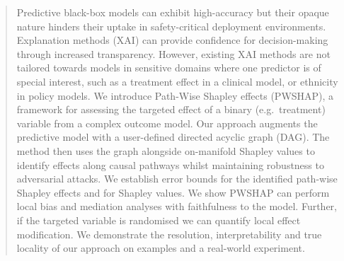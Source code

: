 \documentclass{article}
\theoremstyle{plain}
\theoremstyle{definition}
\theoremstyle{remark}
\theoremstyle{mystyle}
\begin{document}
\printAffiliationsAndNotice{\icmlEqualContribution} %

\begin{abstract}
Predictive black-box models can exhibit high-accuracy but their opaque nature hinders their uptake in safety-critical deployment environments. Explanation methods (XAI) can provide confidence for decision-making through increased transparency. However, existing XAI methods are not tailored towards models in sensitive domains where one predictor is of special interest, such as a treatment effect in a clinical model, or ethnicity in policy models. We introduce Path-Wise Shapley effects (PWSHAP), a framework for assessing the targeted effect of a binary (e.g.~treatment) variable from a complex outcome model. Our approach augments the predictive model with a user-defined directed acyclic graph (DAG). The method then uses the graph alongside on-manifold Shapley values to identify effects along causal pathways whilst maintaining robustness to adversarial attacks. We establish error bounds for the identified path-wise Shapley effects and for Shapley values. We show PWSHAP can perform local bias and mediation analyses with faithfulness to the model. Further, if the targeted variable is randomised we can quantify local effect modification. We demonstrate the resolution, interpretability and true locality of our approach on examples and a real-world experiment. 
\end{abstract}
\end{document}
